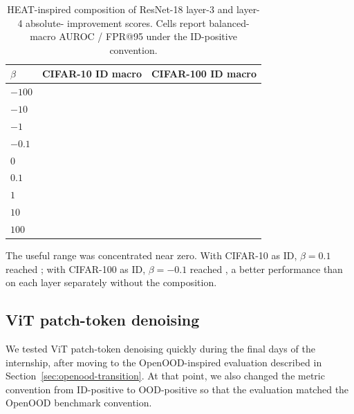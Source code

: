 \begin{table}[ht]
\centering
\small
{}
\begin{tabularx}{0.76\textwidth}{@{}L{2.0cm}*{2}{>{\centering\arraybackslash}X}@{}}
\toprule
$\beta$ & CIFAR-10 ID macro & CIFAR-100 ID macro \\
\midrule
$-100$ &  &  \\
$-10$  &  &  \\
$-1$   &  &  \\
$-0.1$ &  &  \\
$0$    &  &  \\
$0.1$  &  &  \\
$1$    &  &  \\
$10$   &  &  \\
$100$  &  &  \\
\bottomrule
\end{tabularx}
\caption{HEAT-inspired composition of ResNet-18 layer-3 and layer-4 absolute-
improvement scores. Cells report balanced-macro AUROC / FPR@95 under the
ID-positive convention.}
\label{tab:heat-beta-r18}
\end{table}

The useful range was concentrated near zero. With CIFAR-10 as ID,
$\beta=0.1$ reached ; with CIFAR-100 as ID,
$\beta=-0.1$ reached , a better performance than on each layer separately without the composition.

\subsection{ViT patch-token denoising}

\headingindent
We tested ViT patch-token denoising quickly during the final days of the
internship, after moving to the OpenOOD-inspired evaluation described in
Section~\ref{sec:openood-transition}. At that point, we also changed the metric
convention from ID-positive to OOD-positive so that the evaluation matched the
OpenOOD benchmark convention.

